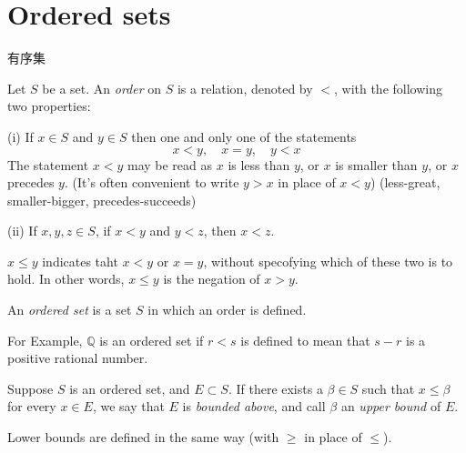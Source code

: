 
\section{Ordered sets}
有序集

\begin{myDefinition}\label{myDefinition:1.5}
Let $S$ be a set. An \emph{order} on $S$ is a relation, denoted by $<$, with the following two properties:

(i) If $x\in S$ and $y\in S$ then one and only one of the statements
\begin{equation*}
    x<y, \quad
    x=y, \quad
    y<x
\end{equation*}
The statement $x<y$ may be read as 
$x$ is less than $y$, or 
$x$ is smaller than $y$, or
$x$ precedes $y$.
(It's often convenient to write $y>x$ in place of $x<y$)
(less-great, smaller-bigger, precedes-succeeds)

(ii) If $x,y,z\in S$, if $x<y$ and $y<z$, then $x<z$.

$x\leq y$ indicates taht $x<y$ or $x=y$, without specofying which of these two is to hold.
In other words, $x\leq y$ is the negation of $x>y$.
\end{myDefinition}



\begin{myDefinition}\label{myDefinition:1.6}
An \emph{ordered set} is a set $S$ in which an order is defined.
\end{myDefinition}

For Example, $\mathbb{Q}$ is an ordered set if $r<s$ is defined to mean that $s-r$ is a positive rational number.


\begin{myDefinition}\label{myDefinition:1.7}
Suppose $S$ is an ordered set, and $E \subset S$. If there exists a
$\beta \in S$ such that $x \leq \beta$ for every $x \in E$, we say that $E$ is \emph{bounded above}, and call
$\beta$ an \emph{upper bound} of $E$.

Lower bounds are defined in the same way (with $\geq$ in place of $\leq$).
\end{myDefinition}

